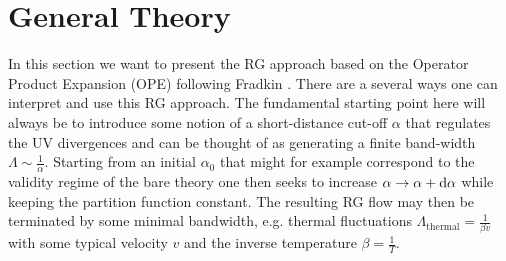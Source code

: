 \documentclass[english, parskip=full]{scrartcl}
\title{\titel}
\author{\autor}
\date{\today}
\begin{document}
\maketitle  %

\section{General Theory}
In this section we want to present the RG approach based on the Operator Product Expansion (OPE) following Fradkin .
There are a several ways one can interpret and use this RG approach.
The fundamental starting point here will always be to introduce some notion of a short-distance cut-off $\alpha$ that regulates the UV divergences and can be thought of as generating a finite band-width $\Lambda\sim \frac{1}{\alpha}$.
Starting from an initial $\alpha_0$ that might for example correspond to the validity regime of the bare theory one then seeks to increase $\alpha\rightarrow \alpha + \text{d} \alpha$ while keeping the partition function constant.
The resulting RG flow may then be terminated by some minimal bandwidth, e.g. thermal fluctuations $\Lambda_\text{thermal} = \frac{1}{\beta v}$ with some typical velocity $v$ and the inverse temperature $\beta=\frac{1}{T}$.
\end{document}
